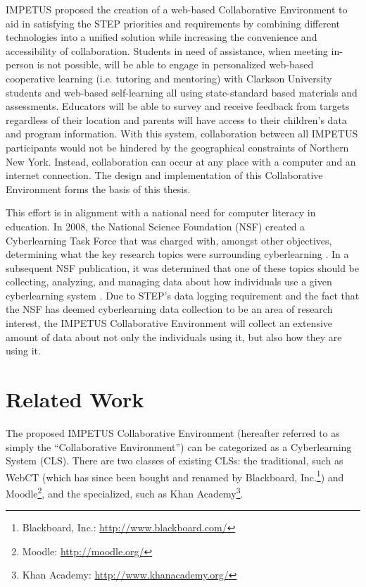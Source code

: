 IMPETUS proposed the creation of a web-based Collaborative Environment to aid in satisfying the STEP priorities and requirements by combining different technologies into a unified solution while increasing the convenience and accessibility of collaboration. Students in need of assistance, when meeting in-person is not possible, will be able to engage in personalized web-based cooperative learning (i.e. tutoring and mentoring) with Clarkson University students and web-based self-learning all using state-standard based materials and assessments. Educators will be able to survey and receive feedback from targets regardless of their location and parents will have access to their children's data and program information. With this system, collaboration between all IMPETUS participants would not be hindered by the geographical constraints of Northern New York. Instead, collaboration can occur at any place with a computer and an internet connection. The design and implementation of this Collaborative Environment forms the basis of this thesis.

This effort is in alignment with a national need for computer literacy in education. In 2008, the National Science Foundation (NSF) created a Cyberlearning Task Force that was charged with, amongst other objectives, determining what the key research topics were surrounding cyberlearning \cite{nsf-taskforce}. In a subsequent NSF publication, it was determined that one of these topics should be collecting, analyzing, and managing data about how individuals use a given cyberlearning system \cite{nsf-cyberlearning}. Due to STEP's data logging requirement and the fact that the NSF has deemed cyberlearning data collection to be an area of research interest, the IMPETUS Collaborative Environment will collect an extensive amount of data about not only the individuals using it, but also how they are using it.

\section{Related Work}
\label{sec:related-work}

The proposed IMPETUS Collaborative Environment (hereafter referred to as simply the ``Collaborative Environment'') can be categorized as a Cyberlearning System (CLS). There are two classes of existing CLSs: the traditional, such as WebCT \cite{webct} (which has since been bought and renamed by Blackboard, Inc.\footnote{Blackboard, Inc.: \url{http://www.blackboard.com/}}) and Moodle\footnote{Moodle: \url{http://moodle.org/}}, and the specialized, such as Khan Academy\footnote{Khan Academy: \url{http://www.khanacademy.org/}}. 

